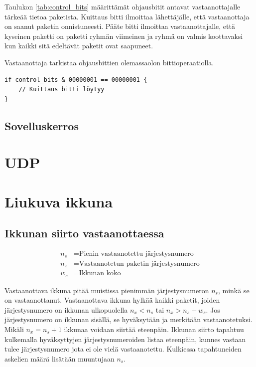 \documentclass[a4paper,12pt]{article}
\begin{document}
    Taulukon \ref{tab:control_bits} määrittämät ohjausbitit antavat vastaanottajalle tärkeää tietoa paketista. Kuittaus bitti ilmoittaa lähettäjälle, että vastaanottaja on saanut paketin onnistuneesti. Pääte bitti ilmoittaa vastaanottajalle, että kyseinen paketti on paketti ryhmän viimeinen ja ryhmä on valmis koottavaksi kun kaikki sitä edeltävät paketit ovat saapuneet. \par
    Vastaanottaja tarkistaa ohjausbittien olemassaolon bittioperaatiolla. 
\begin{lstlisting}[caption={Kuittasbitin tarkistus ohjausbiteistä}, label={lst:ack_check}]
if control_bits & 00000001 == 00000001 {
    // Kuittaus bitti löytyy
}
\end{lstlisting}
    


    
    \subsection{Sovelluskerros}\label{subsec:sovelluskerros}
    \blindtext


    \section{UDP}\label{sec:udp}
    \blindtext


    \section{Liukuva ikkuna}\label{sec:liukuva_ikkuna}


    \subsection{Ikkunan siirto vastaanottaessa}

    \begin{align}
        n_s &= \text{Pienin vastaanotettu järjestysnumero} \\
        n_x &= \text{Vastaanotetun paketin järjestysnumero} \\
        w_s &= \text{Ikkunan koko}
    \end{align}

    Vastaanottava ikkuna pitää muistissa pienimmän järjestysnumeron $n_s$, minkä se on vastaanottanut.
    Vastaanottava ikkuna hylkää kaikki paketit, joiden järjestysnumero on ikkunan ulkopuolella $n_x < n_s$ tai $n_x > n_s + w_s$. Jos järjestysnumero on ikkunan sisällä, se hyväksytään ja merkitään vastaanotetuksi. Mikäli $n_x = n_s + 1$ ikkunaa voidaan siirtää eteenpäin.
    Ikkunan siirto tapahtuu kulkemalla hyväksyttyjen järjestysnumeroiden listaa eteenpäin, kunnes vastaan tulee järjestysnumero jota ei ole vielä vastaanotettu. Kulkiessa tapahtuneiden askelien määrä lisätään muuntujaan $n_s$.
\end{document}
